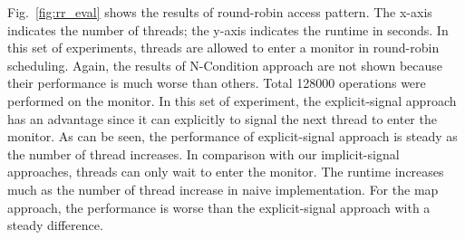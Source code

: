 \documentclass[10pt, conference, compsocconf]{IEEEtran}
\begin{document}
%
Fig.~\ref{fig:rr_eval} shows the results of round-robin access pattern. The
x-axis indicates the number of threads; the y-axis indicates the
runtime in seconds. In this set of experiments, threads are allowed to enter a
monitor in round-robin scheduling. Again, the results of N-Condition approach
are not shown because their performance is much worse than others. Total 
128000 operations were performed on the monitor. In this set
of experiment, the explicit-signal approach has an advantage since it can
explicitly to signal the next thread to enter the monitor. As can be seen, the
performance of explicit-signal approach is steady as the number of thread
increases. In comparison with our implicit-signal approaches, threads can only 
wait to enter the monitor. The runtime increases much as the number of thread 
increase in naive implementation. For the map approach, the performance is 
worse than the explicit-signal approach with a steady difference. 
\end{document}

